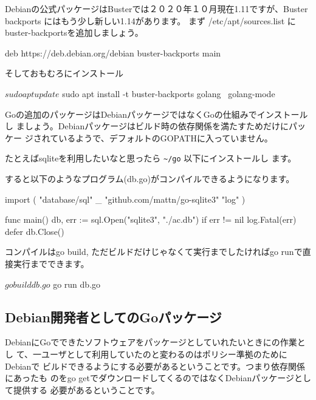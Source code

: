 \documentclass[mingoth,a4paper]{jsarticle}
\begin{document}
Debianの公式パッケージはBusterでは２０２０年１０月現在1.11ですが、Buster backports にはもう少し新しい1.14があります。
まず /etc/apt/sources.list に buster-backportsを追加しましょう。

\begin{commandline}
deb https://deb.debian.org/debian buster-backports main
\end{commandline}

そしておもむろにインストール

\begin{commandline}
$ sudo apt update
$ sudo apt install -t buster-backports golang \
  golang-mode
\end{commandline}

Goの追加のパッケージはDebianパッケージではなくGoの仕組みでインストールし
ましょう。Debianパッケージはビルド時の依存関係を満たすためだけにパッケー
ジされているようで、デフォルトのGOPATHに入っていません。

たとえばsqliteを利用したいなと思ったら \verb!~/go! 以下にインストールし
ます。


すると以下のようなプログラム(db.go)がコンパイルできるようになります。

\begin{commandline}
import (
	"database/sql"
	_ "github.com/mattn/go-sqlite3"
	"log"
)

func main() {
	db, err := sql.Open("sqlite3", "./ac.db")
	if err != nil {
		log.Fatal(err)
	}
	defer db.Close()
}

\end{commandline}

コンパイルはgo build, ただビルドだけじゃなくて実行までしたければgo runで直接実行までできます。

\begin{commandline}
$ go build db.go
$ go run db.go
\end{commandline}

\subsection{Debian開発者としてのGoパッケージ}


DebianにGoでできたソフトウェアをパッケージとしていれたいときにの作業とし
て、一ユーザとして利用していたのと変わるのはポリシー準拠のためにDebianで
ビルドできるようにする必要があるということです。つまり依存関係にあったも
のをgo getでダウンロードしてくるのではなくDebianパッケージとして提供する
必要があるということです。
\end{document}
